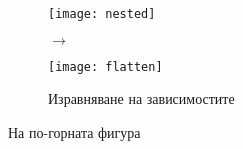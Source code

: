 \begin{figure}[h]
    \centering
    \begin{minipage}{0.5\textwidth}
        \centering
        \texttt{[image: nested]}
    \end{minipage}
    \begin{minipage}{0.05\textwidth}
        \centering
        $ \longrightarrow $
    \end{minipage}
    \begin{minipage}{0.3\textwidth}
        \centering
        \texttt{[image: flatten]}
    \end{minipage}
    \caption{Изравняване на зависимостите}
\end{figure}

На по-горната фигура 





